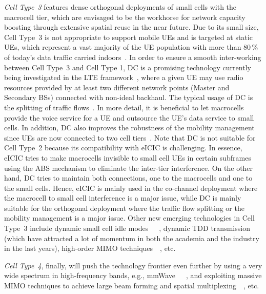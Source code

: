 \documentclass{IEEEtran}
\begin{document}
\emph{Cell Type~3} features dense orthogonal deployments of small cells with the macrocell tier,
which are  envisaged to be the workhorse for network capacity boosting through extensive spatial reuse in the near future.
Due to its small size,
Cell Type~3 is not appropriate to support mobile \acp{UE} and is targeted at static \acp{UE},
which represent a vast majority of the \ac{UE} population
with more than 80\,\% of today's data traffic carried indoors~\cite{Sorrells2014}.
In order to ensure a smooth inter-working between Cell Type~3 and Cell Type 1,
\ac{DC} is a promising technology currently being investigated in the LTE framework~\cite{LTE-R12, 6477646, 6515050, 6825019},
where a given \ac{UE} may use radio resources provided by at least two different network points (Master and Secondary \acp{BS}) connected with non-ideal backhaul.
The typical usage of DC is the splitting of traffic flows~\cite{RP132069}.
In more detail, it is beneficial to let macrocells provide the voice service for a UE and outsource the UE's data service to small cells. In addition, DC also improves the robustness of the mobility management since UEs are now connected to two cell tiers~\cite{RP132069}.
Note that \ac{DC} is not suitable for Cell Type~2 because its compatibility with \ac{eICIC} is challenging.
In essence, eICIC tries to make macrocells invisible to small cell UEs in certain subframes using the ABS mechanism to eliminate the inter-tier interference. 
On the other hand, DC tries to maintain both connections, one to the macrocells and one to the small cells. 
Hence, eICIC is mainly used in the co-channel deployment where the macrocell to small cell interference is a major issue, 
while DC is mainly suitable for the orthogonal deployment where the traffic flow splitting or the mobility management is a major issue.
Other new emerging technologies in Cell Type~3 include dynamic small cell idle modes~\cite{IdleMode2010}~\cite{5978418}~\cite{Razavi:12a}, dynamic \ac{TDD} transmission~\cite{6353682}~\cite{DavidLopez2014homoDynamicTdd}~\cite{DavidLopez2014hetnetDynamicTdd} (which have attracted a lot of momentum in both the academia and the industry in the last years), high-order MIMO techniques~\cite{6692392}~\cite{6965928}, etc.


\emph{Cell Type~4}, finally, will push the technology frontier even further by using a very wide spectrum in high-frequency bands,
e.g., mmWave~\cite{6894456}~\cite{6515173}~\cite{6824746}, and exploiting massive MIMO techniques to achieve large beam forming and spatial multiplexing~\cite{6375940}~\cite{6736761}, etc.
\end{document}
